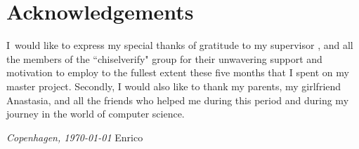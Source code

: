 



\chapter{Acknowledgements}
I would like to express my special thanks of gratitude to my supervisor
\thesissupervisor, and all the members of the ``chiselverify" group for their
unwavering support and motivation to employ to the fullest extent these five
months that I spent on my master project. Secondly, I would also like to thank
my parents, my girlfriend Anastasia, and all the friends who helped me during
this period and during my journey in the world of computer science.


\vspace*{2cm}

\noindent\textit{Copenhagen, \today}
\hfill Enrico
